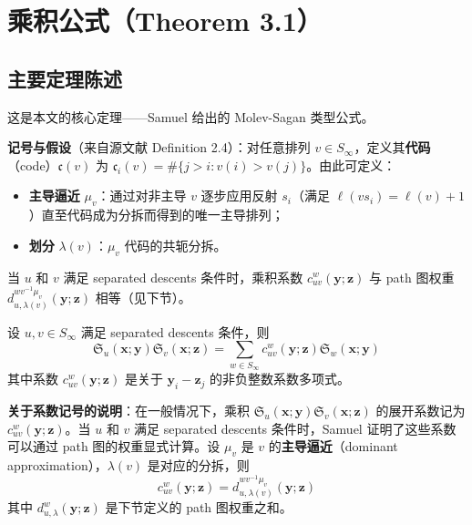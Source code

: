 \section{乘积公式（Theorem 3.1）}
\label{sec:ProductFormula}

\subsection{主要定理陈述}

这是本文的核心定理——Samuel 给出的 Molev-Sagan 类型公式。

\textbf{记号与假设}（来自源文献 Definition 2.4）：对任意排列 $v \in S_\infty$，定义其\textbf{代码}（code）$\mathfrak{c}(v)$ 为 $\mathfrak{c}_i(v) = \#\{j > i : v(i) > v(j)\}$。由此可定义：
\begin{itemize}
\item \textbf{主导逼近} $\mu_v$：通过对非主导 $v$ 逐步应用反射 $s_i$（满足 $\ell(vs_i) = \ell(v)+1$）直至代码成为分拆而得到的唯一主导排列；
\item \textbf{划分} $\lambda(v)$：$\mu_v$ 代码的共轭分拆。
\end{itemize}
当 $u$ 和 $v$ 满足 separated descents 条件时，乘积系数 $c_{uv}^w(\mathbf{y};\mathbf{z})$ 与 path 图权重 $d_{u,\lambda(v)}^{w v^{-1}\mu_v}(\mathbf{y};\mathbf{z})$ 相等（见下节）。

\begin{Theorem}
设 $u, v \in S_\infty$ 满足 separated descents 条件，则
\begin{equation}
\mathfrak{S}_u(\mathbf{x}; \mathbf{y}) \mathfrak{S}_v(\mathbf{x}; \mathbf{z}) = \sum_{w \in S_\infty} c_{uv}^w(\mathbf{y}; \mathbf{z}) \mathfrak{S}_w(\mathbf{x}; \mathbf{y})
\label{eq:ProductFormula}
\end{equation}
其中系数 $c_{uv}^w(\mathbf{y}; \mathbf{z})$ 是关于 $\mathbf{y}_i - \mathbf{z}_j$ 的非负整数系数多项式。
\end{Theorem}

\textbf{关于系数记号的说明}：在一般情况下，乘积 $\mathfrak{S}_u(\mathbf{x}; \mathbf{y}) \mathfrak{S}_v(\mathbf{x}; \mathbf{z})$ 的展开系数记为 $c_{uv}^w(\mathbf{y}; \mathbf{z})$。当 $u$ 和 $v$ 满足 separated descents 条件时，Samuel 证明了这些系数可以通过 path 图的权重显式计算。设 $\mu_v$ 是 $v$ 的\textbf{主导逼近}（dominant approximation），$\lambda(v)$ 是对应的分拆，则
\begin{equation}
c_{uv}^w(\mathbf{y}; \mathbf{z}) = d_{u, \lambda(v)}^{w v^{-1} \mu_v}(\mathbf{y}; \mathbf{z})
\label{eq:c-to-d}
\end{equation}
其中 $d_{u,\lambda}^w(\mathbf{y}; \mathbf{z})$ 是下节定义的 path 图权重之和。

